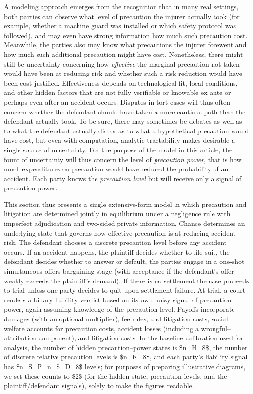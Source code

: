 \documentclass{article}
\begin{document}
A modeling approach emerges from the recognition that in many real settings, both parties can observe what level of precaution the injurer actually took (for example, whether a machine guard was installed or which safety protocol was followed), and may even have strong information how much such precaution cost. Meanwhile, the parties also may know what precautions the injurer forewent and how much such additional precaution might have cost. Nonetheless, there might still be uncertainty concerning how \emph{effective} the marginal precaution not taken would have been at reducing risk and whether such a risk reduction would have been cost-justified. Effectiveness depends on technological fit, local conditions, and other hidden factors that are not fully verifiable or knowable ex ante or perhaps even after an accident occurs. Disputes in tort cases will thus often concern whether the defendant should have taken a more cautious path than the defendant actually took. To be sure, there may sometimes be debates as well as to what the defendant actually did or as to what a hypothetical precaution would have cost, but even with computation, analytic tractability makes desirable a single source of uncertainty. For the purpose of the model in this article, the fount of uncertainty will thus concern the level of \emph{precaution power}, that is how much expenditures on precaution would have reduced the probability of an accident. Each party knows the \emph{precaution level} but will receive only a signal of precaution power. 

This section thus presents a single extensive-form model in which precaution and litigation are determined jointly in equilibrium under a negligence rule with imperfect adjudication and two-sided private information. Chance determines an underlying state that governs how effective precaution is at reducing accident risk. The defendant chooses a discrete precaution level before any accident occurs. If an accident happens, the plaintiff decides whether to file suit, the defendant decides whether to answer or default, the parties engage in a one-shot simultaneous-offers bargaining stage (with acceptance if the defendant’s offer weakly exceeds the plaintiff’s demand). If there is no settlement the case proceeds to trial unless one party decides to quit upon settlement failure. At trial, a court renders a binary liability verdict based on its own noisy signal of precaution power, again assuming knowledge of the precaution level. Payoffs incorporate damages (with an optional multiplier), fee rules, and litigation costs; social welfare accounts for precaution costs, accident losses (including a wrongful--attribution component), and litigation costs. In the baseline calibration used for analysis, the number of hidden precaution--power states is \$n\_H=8\$, the number of discrete relative precaution levels is \$n\_K=8\$, and each party’s liability signal has \$n\_{S\_P}=n\_{S\_D}=8\$ levels; for purposes of preparing illustrative diagrams, we set these counts to \$2\$ (for the hidden state, precaution levels, and the plaintiff/defendant signals), solely to make the figures readable.
\end{document}
